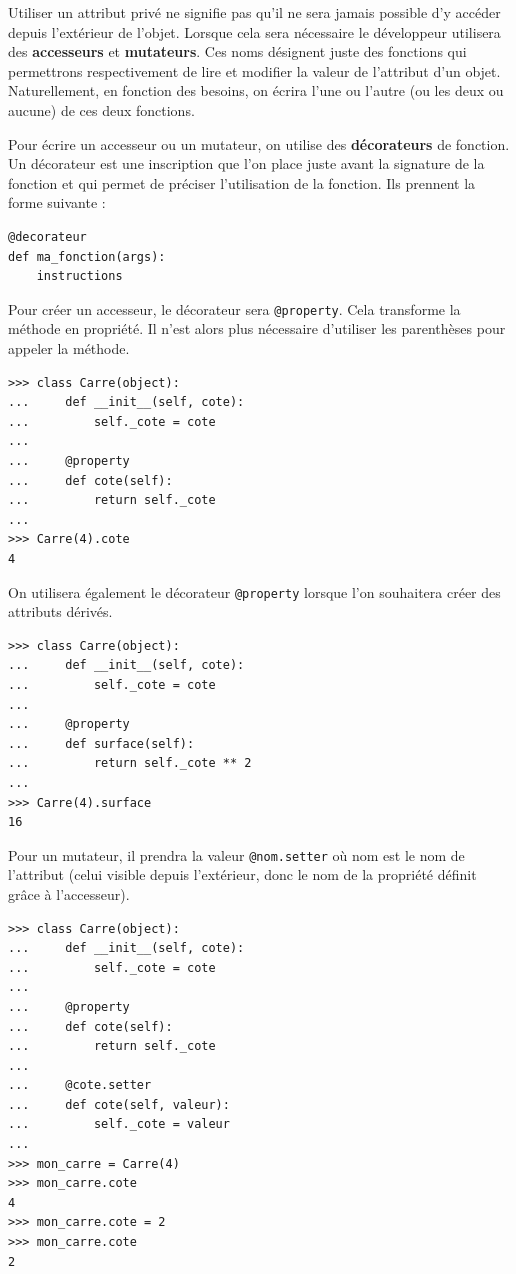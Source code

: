 \documentclass[12pt, a4paper]{article}
\begin{document}
Utiliser un attribut privé ne signifie pas qu'il ne sera jamais possible d'y accéder depuis l'extérieur de l'objet. Lorsque cela sera nécessaire le développeur utilisera des \textbf{accesseurs} et \textbf{mutateurs}. Ces noms désignent juste des fonctions qui permettrons respectivement de lire et modifier la valeur de l'attribut d'un objet. Naturellement, en fonction des besoins, on écrira l'une ou l'autre (ou les deux ou aucune) de ces deux fonctions.

Pour écrire un accesseur ou un mutateur, on utilise des \textbf{décorateurs} de fonction. Un décorateur est une inscription que l'on place juste avant la signature de la fonction et qui permet de préciser l'utilisation de la fonction. Ils prennent la forme suivante :
\begin{lstlisting}
@decorateur
def ma_fonction(args):
	instructions
\end{lstlisting}

Pour créer un accesseur, le décorateur sera \lstinline{@property}. Cela transforme la méthode en propriété. Il n'est alors plus nécessaire d'utiliser les parenthèses pour appeler la méthode.
\begin{lstlisting}
>>> class Carre(object):
...     def __init__(self, cote):
...         self._cote = cote
...
...     @property
...     def cote(self):
...         return self._cote
...
>>> Carre(4).cote
4
\end{lstlisting}

On utilisera également le décorateur \lstinline{@property} lorsque l'on souhaitera créer des attributs dérivés.
\begin{lstlisting}
>>> class Carre(object):
...     def __init__(self, cote):
...         self._cote = cote
...
...     @property
...     def surface(self):
...         return self._cote ** 2
...
>>> Carre(4).surface
16
\end{lstlisting}

Pour un mutateur, il prendra la valeur \lstinline{@nom.setter} où nom est le nom de l'attribut (celui visible depuis l'extérieur, donc le nom de la propriété définit grâce à l'accesseur). 
\begin{lstlisting}
>>> class Carre(object):
...     def __init__(self, cote):
...         self._cote = cote
...
...     @property
...     def cote(self):
...         return self._cote
...
...     @cote.setter
...     def cote(self, valeur):
...         self._cote = valeur
...
>>> mon_carre = Carre(4)
>>> mon_carre.cote
4
>>> mon_carre.cote = 2
>>> mon_carre.cote
2
\end{lstlisting}
\end{document}
